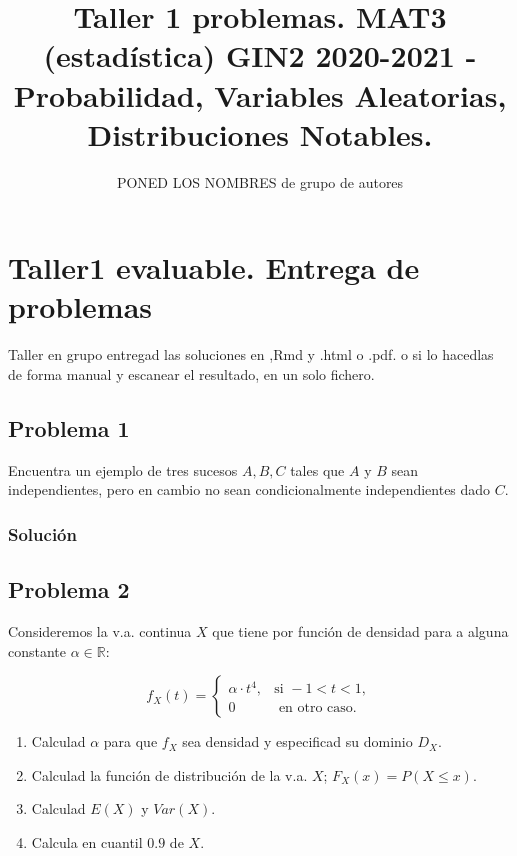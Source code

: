 \documentclass[
]{article}
\title{Taller 1 problemas. MAT3 (estadística) GIN2 2020-2021 -
Probabilidad, Variables Aleatorias, Distribuciones Notables.}
\author{PONED LOS NOMBRES de grupo de autores}
\date{}
\providecommand{\tightlist}{%
  \setlength{\itemsep}{0pt}\setlength{\parskip}{0pt}}
\begin{document}
\maketitle

\hypertarget{taller1-evaluable.-entrega-de-problemas}{%
\section{Taller1 evaluable. Entrega de
problemas}\label{taller1-evaluable.-entrega-de-problemas}}

Taller en grupo entregad las soluciones en ,Rmd y .html o .pdf. o si lo
hacedlas de forma manual y escanear el resultado, en un solo fichero.

\hypertarget{problema-1}{%
\subsection{Problema 1}\label{problema-1}}

Encuentra un ejemplo de tres sucesos \(A,B,C\) tales que \(A\) y \(B\)
sean independientes, pero en cambio no sean condicionalmente
independientes dado \(C\).

\hypertarget{soluciuxf3n}{%
\subsubsection{Solución}\label{soluciuxf3n}}

\hypertarget{problema-2}{%
\subsection{Problema 2}\label{problema-2}}

Consideremos la v.a. continua \(X\) que tiene por función de densidad
para a alguna constante \(\alpha\in \mathbb{R}\):

\[
f_X (t)=
\left\{\begin{array}{ll}
\alpha \cdot t^4, & \mbox{si } -1 < t <1,
 \\
0 & \mbox{ en otro caso}.
\end{array}\right.
\]

\begin{enumerate}
\def\labelenumi{\arabic{enumi}.}
\tightlist
\item
  Calculad \(\alpha\) para que \(f_X\) sea densidad y especificad su
  dominio \(D_X\).
\item
  Calculad la función de distribución de la v.a. \(X\);
  \(F_X(x)=P(X\leq x)\).
\item
  Calculad \(E(X)\) y \(Var(X)\).
\item
  Calcula en cuantil \(0.9\) de \(X\).
\end{enumerate}
\end{document}
